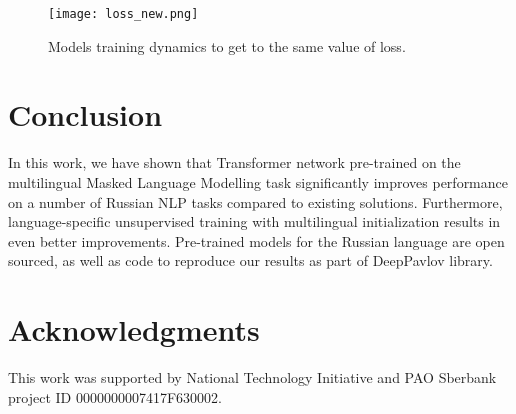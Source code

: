 \documentclass{article}
\begin{document}
\begin{figure}[ht!]
\centering
\texttt{[image: loss\_new.png]}
\caption{Models training dynamics to get to the same value of loss.}
\label{fig:loss}
\end{figure}

\section{Conclusion}

In this work, we have shown that Transformer network pre-trained on the multilingual Masked Language Modelling task significantly improves performance on a number of Russian NLP tasks compared to existing solutions. Furthermore, language-specific unsupervised training with multilingual initialization results in even better improvements. Pre-trained models for the Russian language are open sourced, as well as code to reproduce our results as part of DeepPavlov library.

\section{Acknowledgments}
This work was supported by National Technology Initiative and PAO Sberbank project ID 0000000007417F630002.
\end{document}

